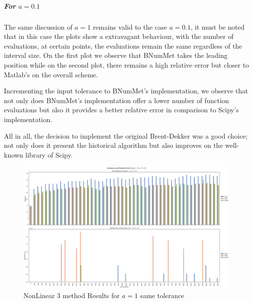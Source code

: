 \subparagraph{For $a=0.1$}
The same discussion of $a=1$ remains valid to the case $a=0.1$, it must be noted that in this case the plots show a extravagant behaviour, with the number of evaluations, at certain points, the evaluations remain the same regardless of the interval size. On the first plot  we observe that BNumMet takes the leading position while on the second plot, there remains a high relative error but closer to Matlab's on the overall scheme.

Incrementing the input tolerance to BNumMet's implementation, we observe  that not only does BNumMet's implementation offer a lower number of function evaluations but also it provides a better relative error in comparison to Scipy's implementation.

All in all, the decision to implement the original Brent-Dekker was a good choice; not only does it present the historical algorithm but also improves on the well-known library of Scipy.

\begin{figure}
    \centering
    \includegraphics[width=\textwidth]{Include/Images/Thesis/Analysis of Solutions/NonLinear AS/NonLinear 3 method Results a-1.png}
    \caption{NonLinear 3 method Results for $a=1$ same tolerance}
    \label{fig:NonLinear 3 method Results for a=1 same tolerance}
\end{figure}

